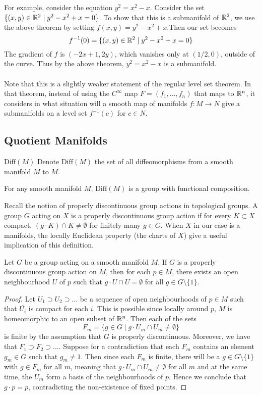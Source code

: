 \documentclass[a4paper]{article}
\begin{document}
For example, consider the equation $y^2=x^2-x$. Consider the set $\{(x,y)\in\mathbb{R}^2\;|\;y^2-x^2+x=0\}$. To show that this is a submanifold of $\mathbb{R}^2$, we use the above theorem by setting $f(x,y)=y^2-x^2+x$.Then our set becomes $$f^{-1}(0)=\{(x,y)\in\mathbb{R}^2\;|\;y^2-x^2+x=0\}$$ The gradient of $f$ is $(-2x+1,2y)$, which vanishes only at $(1/2,0)$, outside of the curve. Thus by the above theorem, $y^2=x^2-x$ is a submanifold. \\~\\

Note that this is a slightly weaker statement of the regular level set theorem. In that theorem, instead of using the $C^\infty$ map $F=(f_1,\dots,f_n)$ that maps to $\mathbb{R}^n$, it considers in what situation will a smooth map of manifolds $f:M\to N$ give a submanifolds on a level set $f^{-1}(c)$ for $c\in N$. 

\subsection{Quotient Manifolds}
\begin{defn}{$\text{Diff}(M)$}{} Denote $\text{Diff}(M)$ the set of all diffeomorphisms from a smooth manifold $M$ to $M$. 
\end{defn}

\begin{lmm}{}{} For any smooth manifold $M$, $\text{Diff}(M)$ is a group with functional composition. 
\end{lmm}

Recall the notion of properly discontinuous group actions in topological groups. A group $G$ acting on $X$ is a properly discontinuous group action if for every $K\subset X$ compact, $(g\cdot K)\cap K\neq\emptyset$ for finitely many $g\in G$. When $X$ in our case is a manifolds, the locally Euclidean property (the charts of $X$) give a useful implication of this definition. 

\begin{prp}{}{} Let $G$ be a group acting on a smooth manifold $M$. If $G$ is a properly discontinuous group action on $M$, then for each $p\in M$, there exists an open neighbourhood $U$ of $p$ such that $g\cdot U\cap U=\emptyset$ for all $g\in G\setminus\{1\}$. \tcbline
\begin{proof}
Let $U_1\supset U_2\supset\dots$ be a sequence of open neighbourhoods of $p\in M$ such that $\overline{U_i}$ is compact for each $i$. This is possible since locally around $p$, $M$ is homeomorphic to an open subset of $\mathbb{R}^n$. Then each of the sets $$F_m=\{g\in G\;|\;g\cdot U_m\cap U_m\neq\emptyset\}$$ is finite by the assumption that $G$ is properly discontinuous. Moreover, we have that $F_1\supset F_2\supset\dots$. Suppose for a contradiction that each $F_m$ contains an element $g_m\in G$ such that $g_m\neq 1$. Then since each $F_m$ is finite, there will be a $g\in G\setminus\{1\}$ with $g\in F_m$ for all $m$, meaning that $g\cdot U_m\cap U_m\neq\emptyset$ for all $m$ and at the same time, the $U_m$ form a basis of the neighbourhoods of $p$. Hence we conclude that $g\cdot p=p$, contradicting the non-existence of fixed points. 
\end{proof}
\end{prp}
\end{document}
